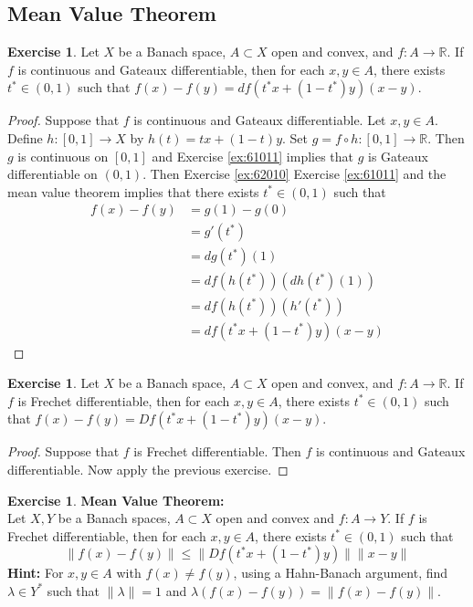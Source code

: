 \documentclass[12pt]{amsart}
\theoremstyle{definition}
\newtheorem{ex}[definition]{Exercise}
\newcommand{\lam}{\lambda}
\newcommand{\R}{\mathbb{R}}
\newcommand{\tbf}[1]{\textbf{#1}}
\DeclareMathOperator*{\0}{\mbf{0}}
\DeclareMathOperator*{\1}{\mbf{1}}
\newcommand{\lex}[1]{\label{ex:#1}}
\newcommand{\rex}[1]{Exercise \ref{ex:#1}}
\begin{document}
	
	
	
	
	
	
	\newpage
	\subsection{Mean Value Theorem}	
	
	\begin{ex} \lex{64001}
	Let $X$ be a Banach space, $A \subset X$ open and convex, and $f:A \rightarrow \R$. If $f$ is continuous and Gateaux differentiable, then for each $x,y \in A$, there exists $t^* \in (0,1)$ such that $f(x) - f(y) = df(t^*x + (1-t^*)y)(x - y)$. 
	\end{ex}
	
	\begin{proof}
	Suppose that $f$ is continuous and Gateaux differentiable. Let $x,y \in A$. Define $h: [0,1] \rightarrow X$ by $h(t) = tx +(1-t)y$. Set $g = f \circ h: [0,1] \rightarrow \R$. Then $g$ is continuous on $[0,1]$ and \rex{61011} implies that $g$ is Gateaux differentiable on $(0,1)$. Then \rex{62010} \rex{61011} and the mean value theorem implies that there exists $t^* \in (0,1)$ such that
	\begin{align*}
	f(x) - f(y)
	&= g(1) - g(0) \\
	&=g'(t^*) \\ 
	&= dg(t^*)(1) \\
	&= df(h(t^*))(dh(t^*)(1)) \\
	&= df(h(t^*))(h'(t^*)) \\
	&= df(t^*x + (1-t^*)y)(x -y)
	\end{align*}
	\end{proof}
	
	\begin{ex} \lex{64002}
	Let $X$ be a Banach space, $A \subset X$ open and convex, and $f:A \rightarrow \R$. If $f$ is Frechet differentiable, then for each $x,y \in A$, there exists $t^* \in (0,1)$ such that $f(x) - f(y) = Df(t^*x + (1-t^*)y)(x - y)$. 
	\end{ex}
	
	\begin{proof}
	Suppose that $f$ is Frechet differentiable. Then $f$ is continuous and Gateaux differentiable. Now apply the previous exercise.	
	\end{proof}
	
	\begin{ex} \lex{64003}\tbf{Mean Value Theorem:}\\
	Let $X, Y$ be a Banach spaces, $A \subset X$ open and convex and $f:A \rightarrow Y$. If $f$ is Frechet differentiable, then for each $x,y \in A$, there exists $t^* \in (0,1)$ such that $$\|f(x) - f(y)\| \leq \|Df(t^*x + (1-t^*)y)\|\|x-y\|$$
	\tbf{Hint:} For $x,y \in A$ with $f(x) \neq f(y)$, using a Hahn-Banach argument, find $\lam \in Y^*$ such that $\|\lam\| = 1 $ and $\lam (f(x) - f(y)) = \|f(x) - f(y)\|$.
	\end{ex}
	
\end{document}
